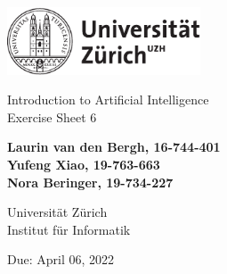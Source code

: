 \documentclass[12pt]{article}
\begin{document}
\begin{titlepage}
\includegraphics[height=20mm]{images/uzh_logo}\\

\begin{flushleft}

\vspace{2cm}

{\Large Introduction to Artificial Intelligence\\Exercise Sheet 6}\\

\vspace{4cm}

\textbf{Laurin van den Bergh, 16-744-401\\Yufeng Xiao, 19-763-663\\Nora Beringer, 19-734-227}\\

\vspace{2cm}

Universität Zürich\\
Institut für Informatik

\vfill Due: April 06, 2022

\vspace{3cm}


\end{flushleft}
\end{titlepage}

\newpage
\end{document}
